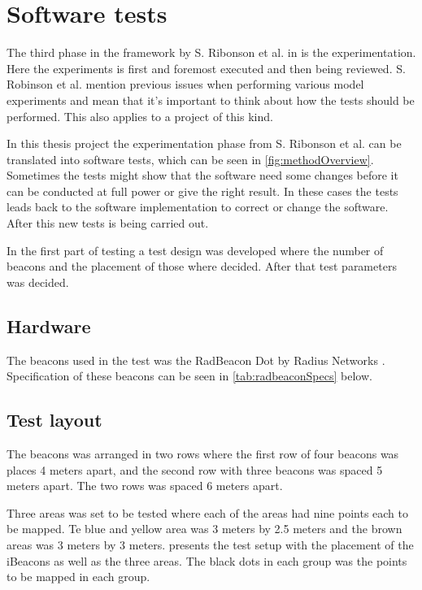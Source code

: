 \section{Software tests}\label{sec:methodSoftwareTests}
The third phase in the framework by S. Ribonson et al. in \cite{SecretsSuccessfulSimulation1995} is the experimentation.
Here the experiments is first and foremost executed and then being reviewed.
S. Robinson et al. mention previous issues when performing various model experiments and mean that it's important to think about how the tests should be performed.
This also applies to a project of this kind.

\bigskip

In this thesis project the experimentation phase from S. Ribonson et al. can be translated into software tests, which can be seen in \cref{fig:methodOverview}.
Sometimes the tests might show that the software need some changes before it can be conducted at full power or give the right result.
In these cases the tests leads back to the software implementation to correct or change the software.
After this new tests is being carried out.

\bigskip

In the first part of testing a test design was developed where the number of beacons and the placement of those where decided.
After that test parameters was decided.


\subsection{Hardware}\label{sec:methodTestHardware}
The beacons used in the test was the RadBeacon Dot by Radius Networks \cite{RadBeaconDotDatasheet}.
Specification of these beacons can be seen in \cref{tab:radbeaconSpecs} below.


\subsection{Test layout}\label{sec:methodTestLayout}
The beacons was arranged in two rows where the first row of four beacons was places 4 meters apart,  and the second row with three beacons was spaced 5 meters apart.
The two rows was spaced 6 meters apart.


\bigskip

Three areas was set to be tested where each of the areas had nine points each to be mapped.
Te blue and yellow area was 3 meters by 2.5 meters and the brown areas was 3 meters by 3 meters.
 presents the test setup with the placement of the iBeacons as well as the three areas.
The black dots in each group was the points to be mapped in each group.

